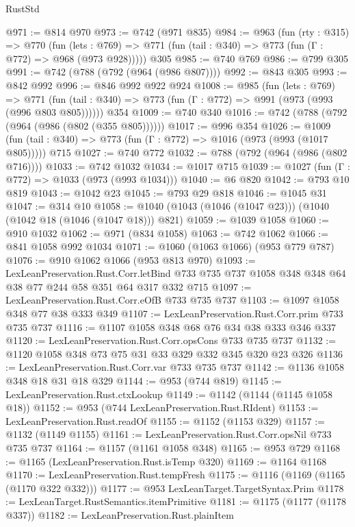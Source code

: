 \begin{lexlean}{RustStd}
\begin{coremodule}
@971 := @814 @970
@973 := @742 (@971 @835)
@984 := @963
    (fun (rty : @315) =>
    @770
      (fun (lets : @769) => @771 (fun (tail : @340) => @773 (fun (Γ : @772) => @968 (@973 @928)))))
    @305
@985 := @740 @769
@986 := @799 @305
@991 := @742 (@788 (@792 (@964 (@986 @807))))
@992 := @843 @305
@993 := @842 @992
@996 := @846 @992 @922 @924
@1008 := @985
    (fun (lets : @769) =>
    @771 (fun (tail : @340) => @773 (fun (Γ : @772) => @991 (@973 (@993 (@996 @803 @805))))))
    @354
@1009 := @740 @340
@1016 := @742 (@788 (@792 (@964 (@986 (@802 (@355 @805))))))
@1017 := @996 @354
@1026 := @1009 (fun (tail : @340) => @773 (fun (Γ : @772) => @1016 (@973 (@993 (@1017 @805))))) @715
@1027 := @740 @772
@1032 := @788 (@792 (@964 (@986 (@802 @716))))
@1033 := @742 @1032
@1034 := @1017 @715
@1039 := @1027 (fun (Γ : @772) => @1033 (@973 (@993 @1034)))
@1040 := @6 @820
@1042 := @793 @10 @819
@1043 := @1042 @23
@1045 := @793 @29 @818
@1046 := @1045 @31
@1047 := @314 @10
@1058 := @1040 (@1043 (@1046 (@1047 @23))) (@1040 (@1042 @18 (@1046 (@1047 @18))) @821)
@1059 := @1039 @1058
@1060 := @910 @1032
@1062 := @971 (@834 @1058)
@1063 := @742 @1062
@1066 := @841 @1058 @992 @1034
@1071 := @1060 (@1063 @1066) (@953 @779 @787)
@1076 := @910 @1062 @1066 (@953 @813 @970)
@1093 := LexLeanPreservation.Rust.Corr.letBind
    @733
    @735
    @737
    @1058
    @348
    @348
    @64
    @38
    @77
    @244
    @58
    @351
    @64
    @317
    @332
    @715
@1097 := LexLeanPreservation.Rust.Corr.eOfB @733 @735 @737
@1103 := @1097 @1058 @348 @77 @38 @333 @349
@1107 := LexLeanPreservation.Rust.Corr.prim @733 @735 @737
@1116 := @1107 @1058 @348 @68 @76 @34 @38 @333 @346 @337
@1120 := LexLeanPreservation.Rust.Corr.opsCons @733 @735 @737
@1132 := @1120 @1058 @348 @73 @75 @31 @33 @329 @332 @345 @320 @23 @326
@1136 := LexLeanPreservation.Rust.Corr.var @733 @735 @737
@1142 := @1136 @1058 @348 @18 @31 @18 @329
@1144 := @953 (@744 @819)
@1145 := LexLeanPreservation.Rust.ctxLookup
@1149 := @1142 (@1144 (@1145 @1058 @18))
@1152 := @953 (@744 LexLeanPreservation.Rust.RIdent)
@1153 := LexLeanPreservation.Rust.readOf
@1155 := @1152 (@1153 @329)
@1157 := @1132 (@1149 @1155)
@1161 := LexLeanPreservation.Rust.Corr.opsNil @733 @735 @737
@1164 := @1157 (@1161 @1058 @348)
@1165 := @953 @729
@1168 := @1165 (LexLeanPreservation.Rust.isTemp @320)
@1169 := @1164 @1168
@1170 := LexLeanPreservation.Rust.tempFresh
@1175 := @1116 (@1169 (@1165 (@1170 @322 @332)))
@1177 := @953 LexLeanTarget.TargetSyntax.Prim
@1178 := LexLeanTarget.RustSemantics.itemPrimitive
@1181 := @1175 (@1177 (@1178 @337))
@1182 := LexLeanPreservation.Rust.plainItem

\end{coremodule}
\end{lexlean}
